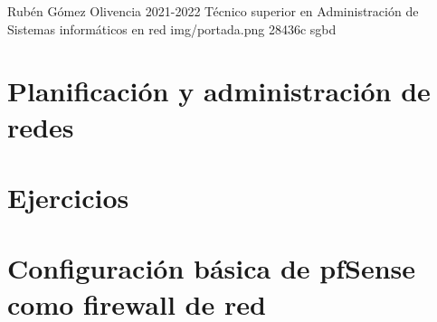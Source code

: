 \documentclass{\ClassPath/yukibook}
\begin{document}
    {Rubén Gómez Olivencia}  %
    {2021-2022}    %
    {Técnico superior en Administración de \linebreak Sistemas informáticos en red} %
    {}%
    {}%
    {img/portada.png} %
    {28436c}
    {sgbd} %

    \coverpage
    \graphicspath{{../../../yukibook.cls/}}
    \licensepage

    \tableofcontents

    \part{Planificación y administración de redes}

    \graphicspath{{../../../temas_comunes/sistemas_de_comunicacion/img}}
    

    \graphicspath{{../../../temas_comunes/sistemas_de_numeracion/img}}
    

    \graphicspath{{../../../temas_comunes/introduccion_a_redes/img}}
    

    \graphicspath{{../../../temas_comunes/direccionamiento_ipv4/img}}
    

    \graphicspath{{../../../temas_comunes/sistemas_de_comunicacion/img}}
    

    \graphicspath{{img/redes/}}
    

    \part{Ejercicios}
    

    

    \part{Configuración básica de pfSense como firewall de red}
    \graphicspath{{../../../otros/PFsense/img/pfsense/}}
    
\end{document}
